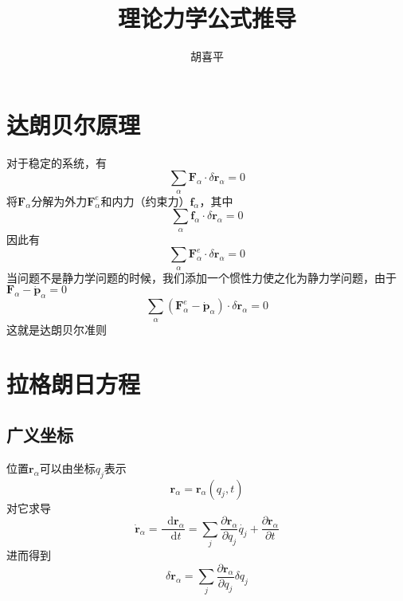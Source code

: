 \documentclass{article}
\author{胡喜平}
\title{理论力学公式推导}
\newcommand*{\dif}{\mathop{}\!\mathrm{d}}
\begin{document}
\maketitle

\section{达朗贝尔原理}

对于稳定的系统，有
\begin{equation}
  \sum\limits_{\alpha} \mathbf{F}_{\alpha} \cdot \delta \mathbf{r}_{\alpha} = 0
\end{equation}
将$\mathbf{F}_{\alpha}$分解为外力$\mathbf{F}_{\alpha}^{e}$和内力（约束力）$\mathbf{f}_{\alpha}$，其中
\begin{equation}
  \sum\limits_{\alpha} \mathbf{f}_{\alpha} \cdot \delta \mathbf{r}_{\alpha} = 0
\end{equation}
因此有
\begin{equation}
  \sum\limits_{\alpha} \mathbf{F}_{\alpha}^{e} \cdot \delta \mathbf{r}_{\alpha} = 0
\end{equation}
当问题不是静力学问题的时候，我们添加一个惯性力使之化为静力学问题，由于$\mathbf{F}_{\alpha} - \dot{\mathbf{p}}_{\alpha} = 0$
\begin{equation}
  \label{eq:0}
  \sum\limits_{\alpha}\left(\mathbf{F}_{\alpha}^{e} - \dot{\mathbf{p}}_{\alpha} \right) \cdot \delta \mathbf{r}_{\alpha} = 0
\end{equation}
这就是达朗贝尔准则

\section{拉格朗日方程}

\subsection{广义坐标}
位置$\mathbf{r}_{\alpha}$可以由坐标$q_{j}$表示
\begin{equation}
  \label{eq:5}
  \mathbf{r}_{\alpha} = \mathbf{r}_{\alpha} \left( q_{j},t \right)
\end{equation}
对它求导
\begin{equation}
  \label{eq:6}
  \dot{\mathbf{r}}_{\alpha} = \frac{\dif \mathbf{r}_{\alpha}}{\dif t} = \sum\limits_{j} \frac{\partial \mathbf{r}_{\alpha}}{\partial q_{j}} \dot{q_{j}} + \frac{\partial \mathbf{r}_{\alpha}}{\partial t}
\end{equation}
进而得到
\begin{equation}
  \label{eq:1}
  \delta \mathbf{r}_{\alpha}= \sum\limits_{j} \frac{\partial \mathbf{r}_{\alpha}}{\partial q_{j}} \delta q_{j}
\end{equation}
\end{document}
